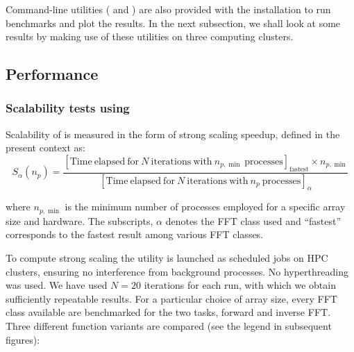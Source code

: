 \documentclass{../jors}
\begin{document}
Command-line utilities ( and
) are also provided with the 
installation to run benchmarks and plot the results. In the next subsection, we
shall look at some results by making use of these utilities on three computing
clusters.

\subsection*{Performance}

\subsubsection*{Scalability tests using }


Scalability of  is measured in the form of strong scaling speedup,
defined in the present context as:
\begin{equation*}
S_\alpha(n_p) = \frac
{[\mathrm{Time\ elapsed\ for\ } N \mathrm{\ iterations\ with\ }n_{p,\min}\mathrm{\ processes}]_{\mathrm{fastest}}
\times n_{p,\min}}
{[\mathrm{Time\ elapsed\ for\ } N \mathrm{\ iterations\ with\ } n_p \mathrm{\
processes}]_\alpha}
\label{eq:speedup}
\end{equation*}

where $n_{p,\min}$ is the minimum number of processes employed for a specific
array size and hardware. The subscripts, $\alpha$ denotes the FFT class used and
``fastest'' corresponds to the fastest result among various FFT classes.

To compute strong scaling the utility  is launched
as scheduled jobs on HPC clusters, ensuring no interference from background
processes. No hyperthreading was used.
%
We have used $N=20$ iterations for each run, with which we obtain sufficiently
repeatable results.
%
For a particular choice of array size, every FFT class available are
benchmarked for the two tasks, forward and inverse FFT. Three different function
variants are compared (see the legend in subsequent figures):
\end{document}

